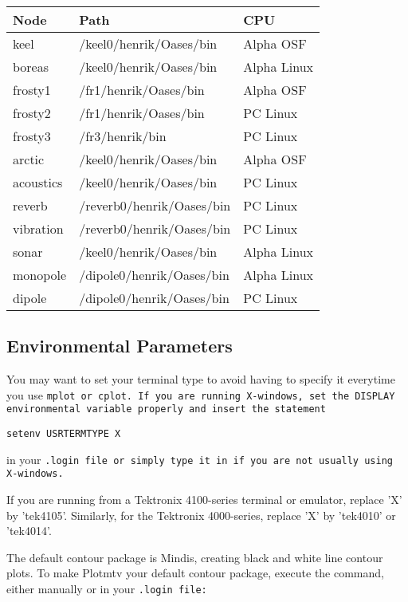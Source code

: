 \begin{center}
\begin{tabular}{|l|l|l|}
Node & Path & CPU \\ \hline
 keel & /keel0/henrik/Oases/bin & Alpha OSF \\
 boreas & /keel0/henrik/Oases/bin & Alpha Linux \\
 frosty1 & /fr1/henrik/Oases/bin & Alpha OSF \\
 frosty2 & /fr1/henrik/Oases/bin & PC Linux  \\
 frosty3 & /fr3/henrik/bin & PC Linux \\
 arctic & /keel0/henrik/Oases/bin & Alpha OSF \\
 acoustics & /keel0/henrik/Oases/bin & PC Linux  \\
 reverb & /reverb0/henrik/Oases/bin & PC Linux \\
 vibration & /reverb0/henrik/Oases/bin & PC Linux \\
 sonar & /keel0/henrik/Oases/bin & Alpha Linux \\ 
 monopole & /dipole0/henrik/Oases/bin & Alpha Linux\\
 dipole & /dipole0/henrik/Oases/bin & PC Linux \\
\end{tabular}
\end{center}

\subsection{Environmental Parameters}

You may want to set your terminal type to avoid having to
specify it everytime you use \tt mplot \rm or \tt cplot. \rm If you
are running X-windows, set the DISPLAY environmental variable properly
and insert the statement

\begin{verbatim}
setenv USRTERMTYPE X 
\end{verbatim}
in your \tt .login \rm file or simply type it in if you are not
usually using X-windows.

If you are running from a Tektronix 4100-series terminal or emulator, 
replace 'X' by 'tek4105'. Similarly, for the Tektronix 4000-series,
replace 'X' by 'tek4010' or 'tek4014'.

The default contour package is Mindis, creating black and white line
contour plots.  To make Plotmtv your default contour package, execute
the command, either manually or in your \tt .login \rm file: 

